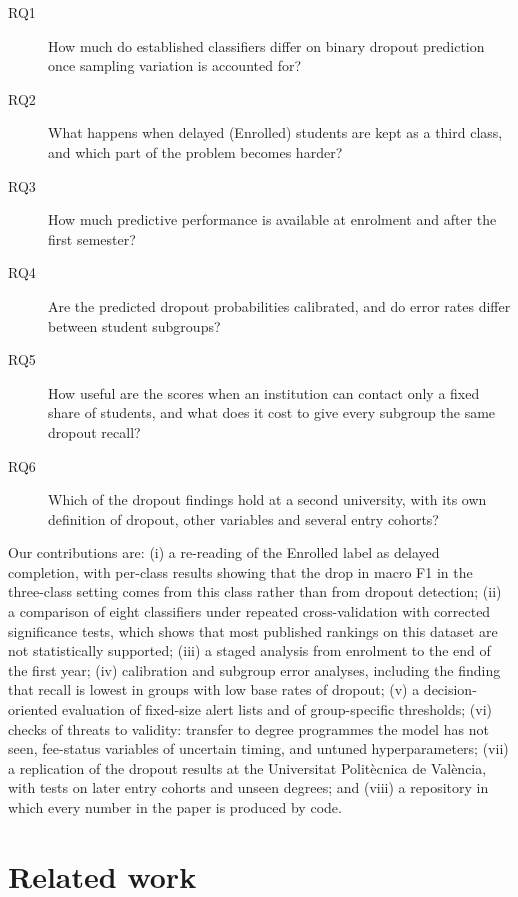\documentclass[11pt,a4paper]{article}
\begin{document}
\begin{description}
  \item[RQ1] How much do established classifiers differ on binary dropout prediction once sampling variation is accounted for?
  \item[RQ2] What happens when delayed (Enrolled) students are kept as a third class, and which part of the problem becomes harder?
  \item[RQ3] How much predictive performance is available at enrolment and after the first semester?
  \item[RQ4] Are the predicted dropout probabilities calibrated, and do error rates differ between student subgroups?
  \item[RQ5] How useful are the scores when an institution can contact only a fixed share of students, and what does it cost to give every subgroup the same dropout recall?
  \item[RQ6] Which of the dropout findings hold at a second university, with its own definition of dropout, other variables and several entry cohorts?
\end{description}

Our contributions are: (i) a re-reading of the Enrolled label as delayed completion, with per-class results showing that the drop in macro F1 in the three-class setting comes from this class rather than from dropout detection; (ii) a comparison of eight classifiers under repeated cross-validation with corrected significance tests, which shows that most published rankings on this dataset are not statistically supported; (iii) a staged analysis from enrolment to the end of the first year; (iv) calibration and subgroup error analyses, including the finding that recall is lowest in groups with low base rates of dropout; (v) a decision-oriented evaluation of fixed-size alert lists and of group-specific thresholds; (vi) checks of threats to validity: transfer to degree programmes the model has not seen, fee-status variables of uncertain timing, and untuned hyperparameters; (vii) a replication of the dropout results at the Universitat Polit\`ecnica de Val\`encia, with tests on later entry cohorts and unseen degrees; and (viii) a repository in which every number in the paper is produced by code.

\section{Related work}
\label{sec:related}
\end{document}
